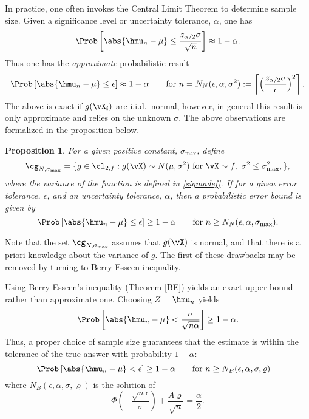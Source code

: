 \documentclass[12pt]{amsart}
\newtheorem{prop}[theorem]{Proposition}
\begin{document}
In practice, one often invokes the Central Limit Theorem to determine sample size. Given a significance level or uncertainty tolerance, $\alpha$, one has
\[
\Prob\left[\abs{\hmu_n-\mu} \le \frac{z_{\alpha/2} \sigma}{\sqrt{n}} \right] \approx 1-\alpha.
\]
Thus one has the \emph{approximate} probabilistic result
\begin{equation} \label{CLTerr}
\Prob\left[\abs{\hmu_n-\mu} \le \epsilon \right] \approx 1-\alpha \qquad \text{for } n=N_{N}(\epsilon,\alpha,\sigma^2) :=\left \lceil \left(\frac{z_{\alpha/2}\sigma}{\epsilon}\right)^2 \right \rceil.
\end{equation}
The above is exact if $g(\vX_i)$ are i.i.d.\ normal, however, in general this result is only approximate and relies on the unknown $\sigma$.  The above observations are formalized in the proposition below.

\begin{prop}  For a given positive constant, $\sigma_{\max}$, define
\[
\cg_{N,\sigma_{\max}}= \{g \in \cl_{2,f} : g(\vX) \sim N(\mu,\sigma^2) \text{ for }\vX \sim f, \ \sigma^2 \le \sigma^2_{\max}, \},
\]
where the variance of the function is defined in \eqref{sigmadef}.  If for a given error tolerance, $\epsilon$, and an uncertainty tolerance, $\alpha$, then a probabilistic error bound is given by
\[
\Prob\left[\abs{\hmu_n-\mu} \le \epsilon \right] \ge 1-\alpha \qquad \text{for } n \ge N_{N}(\epsilon,\alpha,\sigma_{\max}).
\]
\end{prop}

Note that the set $\cg_{N,\sigma_{\max}}$ assumes that $g(\vX)$ is normal, and that there is a priori knowledge about the variance of $g$.  The first of these drawbacks may be removed by turning to Berry-Esseen inequality.

Using Berry-Esseen's inequality (Theorem \ref{BE}) yields an exact upper bound rather than approximate one.  Choosing $Z=\hmu_n$ yields
\[
\Prob\left[\abs{\hmu_n-\mu} < \frac{\sigma}{\sqrt{n \alpha}} \right] \ge 1-\alpha.
\]
Thus, a proper choice of sample size guarantees that the estimate is within the tolerance of the true answer with probability $1-\alpha$:
$$\Prob\left[\abs{\hmu_n-\mu} < \epsilon \right] \ge 1-\alpha \qquad \text{for } n\geq N_B(\epsilon,\alpha,\sigma,\varrho)\quad$$
where $N_B(\epsilon,\alpha,\sigma,\varrho)$ is the solution of
\begin{equation} \label{NB0}
\Phi(-\frac{\sqrt{n}\epsilon}{\sigma})+\frac{A\varrho}{\sqrt{n}}=\frac{\alpha}{2}.
\end{equation}
\end{document}
